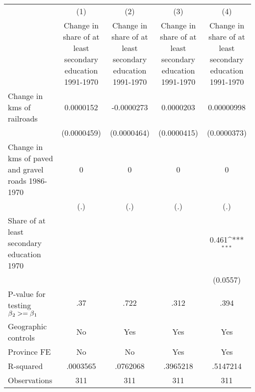 {
\def\sym#1{\ifmmode^{#1}\else\(^{#1}\)\fi}
\begin{tabular}{l*{4}{c}}
\hline\hline
                &\multicolumn{1}{c}{(1)}&\multicolumn{1}{c}{(2)}&\multicolumn{1}{c}{(3)}&\multicolumn{1}{c}{(4)}\\
                &\multicolumn{1}{c}{Change in share of at least secondary education 1991-1970}&\multicolumn{1}{c}{Change in share of at least secondary education 1991-1970}&\multicolumn{1}{c}{Change in share of at least secondary education 1991-1970}&\multicolumn{1}{c}{Change in share of at least secondary education 1991-1970}\\
\hline
Change in kms of railroads&0.0000152         &-0.0000273         &0.0000203         &0.00000998         \\
                &(0.0000459)         &(0.0000464)         &(0.0000415)         &(0.0000373)         \\
[1em]
Change in kms of paved and gravel roads 1986-1970&        0         &        0         &        0         &        0         \\
                &      (.)         &      (.)         &      (.)         &      (.)         \\
[1em]
Share of at least secondary education 1970&                  &                  &                  &    0.461\sym{***}\\
                &                  &                  &                  & (0.0557)         \\
\hline
P-value for testing $\beta\\_2 >= \beta\\_1$&      .37         &     .722         &     .312         &     .394         \\
Geographic controls&       No         &      Yes         &      Yes         &      Yes         \\
Province FE     &       No         &       No         &      Yes         &      Yes         \\
R-squared       & .0003565         & .0762068         & .3965218         & .5147214         \\
Observations    &      311         &      311         &      311         &      311         \\
\hline\hline
\end{tabular}
}
